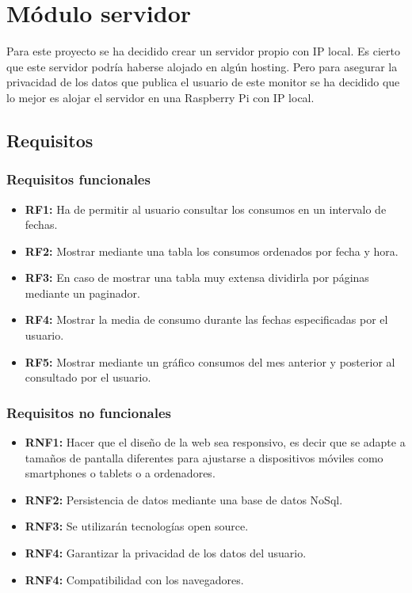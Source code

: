 \chapter{Módulo servidor}
Para este proyecto se ha decidido crear un servidor propio con IP local. Es cierto que este servidor podría haberse alojado en algún hosting. Pero para asegurar la privacidad de los datos que publica el usuario de este monitor se ha decidido que lo mejor es alojar el servidor en una Raspberry Pi con IP local.

\section{Requisitos}
\subsection{Requisitos funcionales}

\begin{itemize}
	\item\textbf{RF1: } Ha de permitir al usuario consultar los consumos en un intervalo de fechas.
	\item\textbf{RF2: } Mostrar mediante una tabla los consumos ordenados por fecha y hora.
	\item\textbf{RF3: } En caso de mostrar una tabla muy extensa dividirla por páginas mediante un paginador.
	\item\textbf{RF4: } Mostrar la media de consumo durante las fechas especificadas por el usuario.
	\item\textbf{RF5: } Mostrar mediante un gráfico consumos del mes anterior y posterior al consultado por el usuario.
\end{itemize}

\subsection{Requisitos no funcionales}

\begin{itemize}
	\item\textbf{RNF1: } Hacer que el diseño de la web sea responsivo, es decir que se adapte a tamaños de pantalla diferentes para ajustarse a dispositivos móviles como smartphones o tablets o a ordenadores.
	\item\textbf{RNF2: } Persistencia de datos mediante una base de datos NoSql.
	\item\textbf{RNF3: } Se utilizarán tecnologías open source.
	\item\textbf{RNF4: } Garantizar la privacidad de los datos del usuario.
	\item\textbf{RNF4: } Compatibilidad con los navegadores.
\end{itemize}

